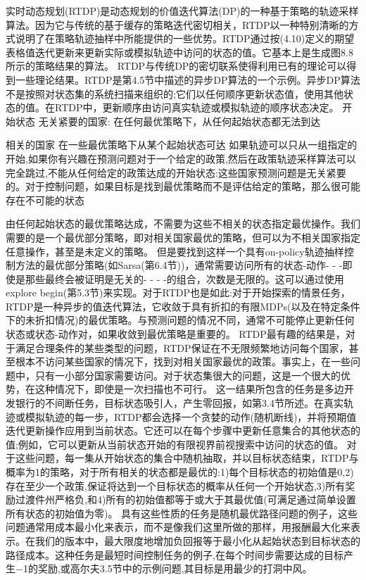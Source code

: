 实时动态规划(RTDP)是动态规划的价值迭代算法(DP)的一种基于策略的轨迹采样算法。因为它与传统的基于缓存的策略迭代密切相关，RTDP以一种特别清晰的方式说明了在策略轨迹抽样中所能提供的一些优势。RTDP通过按(4.10)定义的期望表格值迭代更新来更新实际或模拟轨迹中访问的状态的值。它基本上是生成图8.8所示的策略结果的算法。
RTDP与传统DP的密切联系使得利用已有的理论可以得到一些理论结果。RTDP是第4.5节中描述的异步DP算法的一个示例。异步DP算法不是按照对状态集的系统扫描来组织的;它们以任何顺序更新状态值，使用其他状态的值。在RTDP中，更新顺序由访问真实轨迹或模拟轨迹的顺序状态决定。
开始状态
无关紧要的国家:
在任何最优策略下，从任何起始状态都无法到达

相关的国家
在一些最优策略下从某个起始状态可达
如果轨迹可以只从一组指定的开始,如果你有兴趣在预测问题对于一个给定的政策,然后在政策轨迹采样算法可以完全跳过,不能从任何给定的政策达成的开始状态:这些国家预测问题是无关紧要的。对于控制问题，如果目标是找到最优策略而不是评估给定的策略，那么很可能存在不可能的状态

由任何起始状态的最优策略达成，不需要为这些不相关的状态指定最优操作。我们需要的是一个最优部分策略，即对相关国家最优的策略，但可以为不相关国家指定任意操作，甚至是未定义的策略。
但是要找到这样一个具有on-policy轨迹抽样控制方法的最优部分策略(如Sarsa(第6.4节))，通常需要访问所有的状态-动作- - -即使是那些最终会被证明是无关的- - - -的组合，次数是无限的。这可以通过使用explore begin(第5.3节)来实现。对于RTDP也是如此:对于开始探索的情景任务，RTDP是一种异步的值迭代算法，它收敛于具有折扣的有限MDPs(以及在特定条件下的未折扣情况)的最优策略。与预测问题的情况不同，通常不可能停止更新任何状态或状态-动作对，如果收敛到最优策略是重要的。
RTDP最有趣的结果是，对于满足合理条件的某些类型的问题，RTDP保证在不无限频繁地访问每个国家，甚至根本不访问某些国家的情况下，找到对相关国家最优的政策。事实上，在一些问题中，只有一小部分国家需要访问。对于状态集很大的问题，这是一个很大的优势，在这种情况下，即使是一次扫描也不可行。
这一结果所包含的任务是多边开发银行的不间断任务，目标状态吸引人，产生零回报，如第3.4节所述。在真实轨迹或模拟轨迹的每一步，RTDP都会选择一个贪婪的动作(随机断线)，并将预期值迭代更新操作应用到当前状态。它还可以在每个步骤中更新任意集合的其他状态的值;例如，它可以更新从当前状态开始的有限视界前视搜索中访问的状态的值。
对于这些问题，每一集从开始状态的集合中随机抽取，并以目标状态结束，RTDP与概率为1的策略，对于所有相关的状态都是最优的:1)每个目标状态的初始值是0,2)存在至少一个政策,保证将达到一个目标状态的概率从任何一个开始状态,3)所有奖励过渡件州严格负,和4)所有的初始值都等于或大于其最优值(可满足通过简单设置所有状态的初始值为零)。
具有这些性质的任务是随机最优路径问题的例子，这些问题通常用成本最小化来表示，而不是像我们这里所做的那样，用报酬最大化来表示。在我们的版本中，最大限度地增加负回报等于最小化从起始状态到目标状态的路径成本。这种任务是最短时间控制任务的例子,在每个时间步需要达成的目标产生−1的奖励,或高尔夫3.5节中的示例问题,其目标是用最少的打洞中风。

